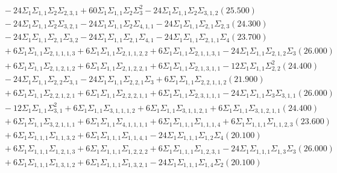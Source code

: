 \documentclass[12pt]{article}
\begin{document}
\begin{landscape}
\begin{align*}
		&\quad\quad -24\Sigma_{1}\Sigma_{1,1}\Sigma_{2}\Sigma_{2,3,1}+60\Sigma_{1}\Sigma_{1,1}\Sigma_{2}\Sigma_{3}^{2}-24\Sigma_{1}\Sigma_{1,1}\Sigma_{2}\Sigma_{3,1,2}(25.500) \\ 
		&\quad\quad -24\Sigma_{1}\Sigma_{1,1}\Sigma_{2}\Sigma_{3,2,1}-24\Sigma_{1}\Sigma_{1,1}\Sigma_{2}\Sigma_{4,1,1}-24\Sigma_{1}\Sigma_{1,1}\Sigma_{2,1}\Sigma_{2,3}(24.300) \\ 
		&\quad\quad -24\Sigma_{1}\Sigma_{1,1}\Sigma_{2,1}\Sigma_{3,2}-24\Sigma_{1}\Sigma_{1,1}\Sigma_{2,1}\Sigma_{4,1}-24\Sigma_{1}\Sigma_{1,1}\Sigma_{2,1,1}\Sigma_{4}(23.700) \\ 
		&\quad\quad +6\Sigma_{1}\Sigma_{1,1}\Sigma_{2,1,1,1,3}+6\Sigma_{1}\Sigma_{1,1}\Sigma_{2,1,1,2,2}+6\Sigma_{1}\Sigma_{1,1}\Sigma_{2,1,1,3,1}-24\Sigma_{1}\Sigma_{1,1}\Sigma_{2,1,2}\Sigma_{3}(26.000) \\ 
		&\quad\quad +6\Sigma_{1}\Sigma_{1,1}\Sigma_{2,1,2,1,2}+6\Sigma_{1}\Sigma_{1,1}\Sigma_{2,1,2,2,1}+6\Sigma_{1}\Sigma_{1,1}\Sigma_{2,1,3,1,1}-12\Sigma_{1}\Sigma_{1,1}\Sigma_{2,2}^{2}(24.400) \\ 
		&\quad\quad -24\Sigma_{1}\Sigma_{1,1}\Sigma_{2,2}\Sigma_{3,1}-24\Sigma_{1}\Sigma_{1,1}\Sigma_{2,2,1}\Sigma_{3}+6\Sigma_{1}\Sigma_{1,1}\Sigma_{2,2,1,1,2}(21.900) \\ 
		&\quad\quad +6\Sigma_{1}\Sigma_{1,1}\Sigma_{2,2,1,2,1}+6\Sigma_{1}\Sigma_{1,1}\Sigma_{2,2,2,1,1}+6\Sigma_{1}\Sigma_{1,1}\Sigma_{2,3,1,1,1}-24\Sigma_{1}\Sigma_{1,1}\Sigma_{3}\Sigma_{3,1,1}(26.000) \\ 
		&\quad\quad -12\Sigma_{1}\Sigma_{1,1}\Sigma_{3,1}^{2}+6\Sigma_{1}\Sigma_{1,1}\Sigma_{3,1,1,1,2}+6\Sigma_{1}\Sigma_{1,1}\Sigma_{3,1,1,2,1}+6\Sigma_{1}\Sigma_{1,1}\Sigma_{3,1,2,1,1}(24.400) \\ 
		&\quad\quad +6\Sigma_{1}\Sigma_{1,1}\Sigma_{3,2,1,1,1}+6\Sigma_{1}\Sigma_{1,1}\Sigma_{4,1,1,1,1}+6\Sigma_{1}\Sigma_{1,1,1}\Sigma_{1,1,1,4}+6\Sigma_{1}\Sigma_{1,1,1}\Sigma_{1,1,2,3}(23.600) \\ 
		&\quad\quad +6\Sigma_{1}\Sigma_{1,1,1}\Sigma_{1,1,3,2}+6\Sigma_{1}\Sigma_{1,1,1}\Sigma_{1,1,4,1}-24\Sigma_{1}\Sigma_{1,1,1}\Sigma_{1,2}\Sigma_{4}(20.100) \\ 
		&\quad\quad +6\Sigma_{1}\Sigma_{1,1,1}\Sigma_{1,2,1,3}+6\Sigma_{1}\Sigma_{1,1,1}\Sigma_{1,2,2,2}+6\Sigma_{1}\Sigma_{1,1,1}\Sigma_{1,2,3,1}-24\Sigma_{1}\Sigma_{1,1,1}\Sigma_{1,3}\Sigma_{3}(26.000) \\ 
		&\quad\quad +6\Sigma_{1}\Sigma_{1,1,1}\Sigma_{1,3,1,2}+6\Sigma_{1}\Sigma_{1,1,1}\Sigma_{1,3,2,1}-24\Sigma_{1}\Sigma_{1,1,1}\Sigma_{1,4}\Sigma_{2}(20.100) \\ 

\end{align*}
\end{landscape}
\end{document}
